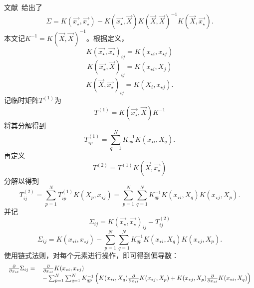 \documentclass[index]{subfiles}
\begin{document}
文献~给出了
\begin{equation}
 \Sigma = K(\vec{x_{\star}}, \vec{x_{\star}}) - K(\vec{x_{\star}}, \vec{X}) K(\vec{X}, \vec{X})^{-1} K(\vec{X}, \vec{x_{\star}}).
\end{equation}
本文记$K^{-1} = K(\vec{X}, \vec{X})^{-1}$。根据定义，
\begin{equation}
 K(\vec{x_{\star}}, \vec{x_{\star}})_{ij} = K(x_{\star i}, x_{\star j})
\end{equation}
\begin{equation}
 K(\vec{x_{\star}}, \vec{X})_{ij} = K(x_{\star i}, X_{j})
\end{equation}
\begin{equation}
 K(\vec{X}, \vec{x_{\star}})_{ij} = K(X_{i}, x_{\star j}).
\end{equation}
记临时矩阵$T^{(1)}$为
\begin{equation}
 T^{(1)} = K(\vec{x_{\star}}, \vec{X}) K^{-1}
\end{equation}
将其分解得到
\begin{equation}
 T^{(1)}_{ip} = \sum_{q = 1}^{N} K^{-1}_{qp} K(x_{\star i}, X_{q}).
\end{equation}
再定义
\begin{equation}
 T^{(2)} = T^{(1)} K(\vec{X}, \vec{x_{\star}})
\end{equation}
分解以得到
\begin{equation}
 T^{(2)}_{ij} = \sum_{p = 1}^{N} T^{(1)}_{ip} K(X_{p}, x_{\star j}) = \sum_{p = 1}^{N} \sum_{q = 1}^{N} K^{-1}_{qp} K(x_{\star i}, X_{q}) K(x_{\star j}, X_{p}).
\end{equation}
并记
\begin{equation}
 \Sigma_{ij} = K(\vec{x_{\star}}, \vec{x_{\star}})_{ij} - T^{(2)}_{ij}
\end{equation}
\begin{equation}
 \Sigma_{ij} = K(x_{\star i}, x_{\star j}) - \sum_{p = 1}^{N} \sum_{q = 1}^{N} K^{-1}_{qp} K(x_{\star i}, X_{q}) K(x_{\star j}, X_{p}).
\end{equation}
使用链式法则，对每个元素进行操作，即可得到偏导数：
\begin{equation}
 \begin{tabular}{rl}
 $\frac{\partial}{\partial x_{\star t}} \Sigma_{ij} =$ & $\frac{\partial}{\partial x_{\star t}} K(x_{\star i}, x_{\star j})$ \\
 & $- \sum_{p = 1}^{N} \sum_{q = 1}^{N} K^{-1}_{qp} \left( K(x_{\star i}, X_{q}) \frac{\partial}{\partial x_{\star t}} K(x_{\star j}, X_{p}) + K(x_{\star j}, X_{p}) \frac{\partial}{\partial x_{\star t}} K(x_{\star i}, X_{q}) \right)$
 \end{tabular}
\end{equation}
\end{document}
